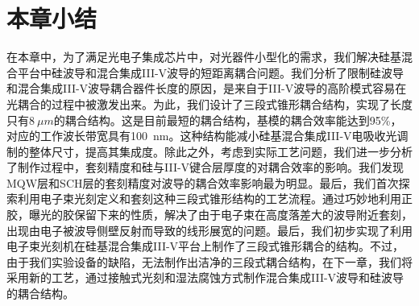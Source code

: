 \section{本章小结}
在本章中，为了满足光电子集成芯片中，对光器件小型化的需求，我们解决硅基混合平台中硅波导和混合集成III-V波导的短距离耦合问题。我们分析了限制硅波导和混合集成III-V波导耦合器件长度的原因，是来自于III-V波导的高阶模式容易在光耦合的过程中被激发出来。为此，我们设计了三段式锥形耦合结构，实现了长度只有$8 ~\mu m$的耦合结构。这是目前最短的耦合结构，基模的耦合效率能达到95\%，对应的工作波长带宽具有100~nm。这种结构能减小硅基混合集成III-V电吸收光调制的整体尺寸，提高其集成度。除此之外，考虑到实际工艺问题，我们进一步分析了制作过程中，套刻精度和硅与III-V键合层厚度的对耦合效率的影响。我们发现MQW层和SCH层的套刻精度对波导的耦合效率影响最为明显。最后，我们首次探索利用电子束光刻定义和套刻这种三段式锥形结构的工艺流程。通过巧妙地利用正胶，曝光的胶保留下来的性质，解决了由于电子束在高度落差大的波导附近套刻，出现由电子被波导侧壁反射而导致的线形展宽的问题。最后，我们初步实现了利用电子束光刻机在硅基混合集成III-V平台上制作了三段式锥形耦合的结构。不过，由于我们实验设备的缺陷，无法制作出洁净的三段式耦合结构，在下一章，我们将采用新的工艺，通过接触式光刻和湿法腐蚀方式制作混合集成III-V波导和硅波导的耦合结构。